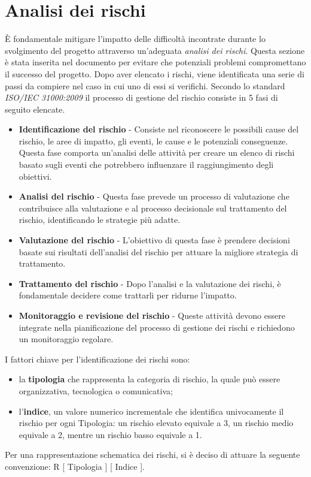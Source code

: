 \section{Analisi dei rischi} %
È fondamentale mitigare l'impatto delle difficoltà incontrate durante lo svolgimento del progetto attraverso un'adeguata \textit{analisi dei rischi}. Questa sezione è stata inserita nel documento per evitare che potenziali problemi compromettano il successo del progetto.
Dopo aver elencato i rischi, viene identificata una serie di passi da compiere nel caso in cui uno di essi si verifichi. Secondo lo standard \textit{ISO/IEC 31000:2009} il processo di gestione del rischio consiste in 5 fasi di seguito elencate.
\begin{itemize}
    \item \textbf{Identificazione del rischio} - Consiste nel riconoscere le possibili cause del rischio, le aree di impatto, gli eventi, le cause e le potenziali conseguenze. Questa fase comporta un'analisi delle attività per creare un elenco di rischi basato sugli eventi che potrebbero influenzare il raggiungimento degli obiettivi.
    \item \textbf{Analisi del rischio} - Questa fase prevede un processo di valutazione che contribuisce alla valutazione e al processo decisionale sul trattamento del rischio, identificando le strategie più adatte.
    \item \textbf{Valutazione del rischio} - L'obiettivo di questa fase è prendere decisioni basate sui risultati dell'analisi del rischio per attuare la migliore strategia di trattamento.
    \item \textbf{Trattamento del rischio} - Dopo l'analisi e la valutazione dei rischi, è fondamentale decidere come trattarli per ridurne l'impatto.
    \item \textbf{Monitoraggio e revisione del rischio} - Queste attività devono essere integrate nella pianificazione del processo di gestione dei rischi e richiedono un monitoraggio regolare.
\end{itemize}
I fattori chiave per l'identificazione dei rischi sono:
\begin{itemize}
    \item la \textbf{tipologia} che rappresenta la categoria di rischio, la quale può essere organizzativa, tecnologica o comunicativa;
    \item l'\textbf{indice}, un valore numerico incrementale che identifica univocamente il rischio per ogni Tipologia: un rischio elevato equivale a 3, un rischio medio equivale a 2, mentre un rischio basso equivale a 1.
\end{itemize}
Per una rappresentazione schematica dei rischi, si è deciso di attuare la seguente convenzione: R [ Tipologia ] [ Indice ].

